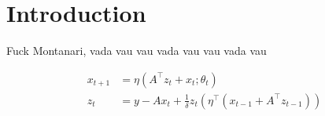 \chapter{Introduction}

Fuck Montanari, vada vau vau vada vau vau vada vau 

\begin{equation*}
    \begin{split}
       x_{t+1} &= \eta\left(A^{\top} z_t + x_t; \theta_t\right)\\
       z_{t} &= y - A x_t + \frac{1}{\delta} z_t \left(\eta^{\top}(x_{t-1} + A^{\top} z_{t-1})\right)
    \end{split}
\end{equation*}